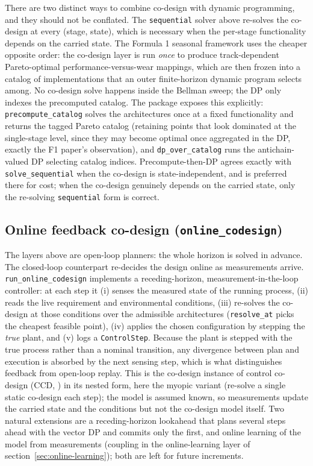 \documentclass[11pt,a4paper]{article}
\begin{document}
There are two distinct ways to combine co-design with dynamic programming,
and they should not be conflated. The \texttt{sequential} solver above
re-solves the co-design at every (stage, state), which is necessary when
the per-stage functionality depends on the carried state. The Formula 1
seasonal framework \citep{neumann2025formula1} uses the cheaper opposite order: the co-design
layer is run \emph{once} to produce track-dependent Pareto-optimal
performance-versus-wear mappings, which are then frozen into a catalog of
implementations that an outer finite-horizon dynamic program selects
among. No co-design solve happens inside the Bellman sweep; the DP only
indexes the precomputed catalog. The package exposes this explicitly:
\texttt{precompute\_catalog} solves the architectures once at a fixed
functionality and returns the tagged Pareto catalog (retaining points that
look dominated at the single-stage level, since they may become optimal
once aggregated in the DP, exactly the F1 paper's observation), and
\texttt{dp\_over\_catalog} runs the antichain-valued DP selecting catalog
indices. Precompute-then-DP agrees exactly with \texttt{solve\_sequential}
when the co-design is state-independent, and is preferred there for cost;
when the co-design genuinely depends on the carried state, only the
re-solving \texttt{sequential} form is correct.

\subsection{Online feedback co-design (\texttt{online\_codesign})}
\label{sec:online-cd}

The layers above are open-loop planners: the whole horizon is solved in
advance. The closed-loop counterpart re-decides the design online as
measurements arrive. \texttt{run\_online\_codesign} implements a
receding-horizon, measurement-in-the-loop controller: at each step it
(i) senses the measured state of the running process, (ii) reads the live
requirement and environmental conditions, (iii) re-solves the co-design at
those conditions over the admissible architectures (\texttt{resolve\_at}
picks the cheapest feasible point), (iv) applies the chosen configuration
by stepping the \emph{true} plant, and (v) logs a \texttt{ControlStep}.
Because the plant is stepped with the true process rather than a nominal
transition, any divergence between plan and execution is absorbed by the
next sensing step, which is what distinguishes feedback from open-loop
replay. This is the co-design instance of control co-design
(CCD, \citealp{garciasanz2019ccd}) in
its nested form, here the myopic variant (re-solve a single static
co-design each step); the model is assumed known, so measurements update
the carried state and the conditions but not the co-design model itself.
Two natural extensions are a receding-horizon lookahead that plans several
steps ahead with the vector DP and commits only the first, and online
learning of the model from measurements (coupling in the online-learning
layer of section~\ref{sec:online-learning}); both are left for future increments.
\end{document}

